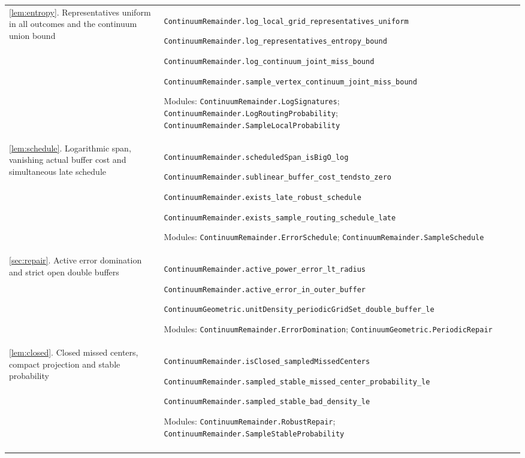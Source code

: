 \begin{longtable}{@{}p{}p{}@{}}
\ref{lem:entropy}. Representatives uniform in all outcomes and the continuum union bound & \nolinkurl{ContinuumRemainder.log_local_grid_representatives_uniform}\par \nolinkurl{ContinuumRemainder.log_representatives_entropy_bound}\par \nolinkurl{ContinuumRemainder.log_continuum_joint_miss_bound}\par \nolinkurl{ContinuumRemainder.sample_vertex_continuum_joint_miss_bound}\par\smallskip Modules: \nolinkurl{ContinuumRemainder.LogSignatures}; \nolinkurl{ContinuumRemainder.LogRoutingProbability}; \nolinkurl{ContinuumRemainder.SampleLocalProbability} \\\addlinespace
\ref{lem:schedule}. Logarithmic span, vanishing actual buffer cost and simultaneous late schedule & \nolinkurl{ContinuumRemainder.scheduledSpan_isBigO_log}\par \nolinkurl{ContinuumRemainder.sublinear_buffer_cost_tendsto_zero}\par \nolinkurl{ContinuumRemainder.exists_late_robust_schedule}\par \nolinkurl{ContinuumRemainder.exists_sample_routing_schedule_late}\par\smallskip Modules: \nolinkurl{ContinuumRemainder.ErrorSchedule}; \nolinkurl{ContinuumRemainder.SampleSchedule} \\\addlinespace
\ref{sec:repair}. Active error domination and strict open double buffers & \nolinkurl{ContinuumRemainder.active_power_error_lt_radius}\par \nolinkurl{ContinuumRemainder.active_error_in_outer_buffer}\par \nolinkurl{ContinuumGeometric.unitDensity_periodicGridSet_double_buffer_le}\par\smallskip Modules: \nolinkurl{ContinuumRemainder.ErrorDomination}; \nolinkurl{ContinuumGeometric.PeriodicRepair} \\\addlinespace
\ref{lem:closed}. Closed missed centers, compact projection and stable probability & \nolinkurl{ContinuumRemainder.isClosed_sampledMissedCenters}\par \nolinkurl{ContinuumRemainder.sampled_stable_missed_center_probability_le}\par \nolinkurl{ContinuumRemainder.sampled_stable_bad_density_le}\par\smallskip Modules: \nolinkurl{ContinuumRemainder.RobustRepair}; \nolinkurl{ContinuumRemainder.SampleStableProbability} \\\addlinespace

\end{longtable}
